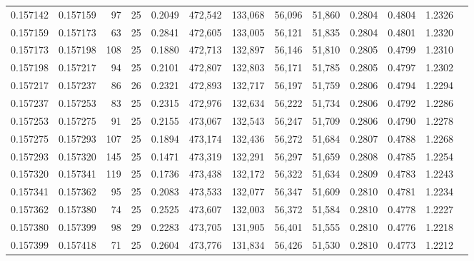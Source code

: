 \begin{tabular}{rrrrrrrrrrrrr}
0.157142 & 0.157159 &    97 &  25 &                                     0.2049 & 472,542 & 133,068 &  56,096 &  51,860 & 0.2804 & 0.4804 & 1.2326 \\
0.157159 & 0.157173 &    63 &  25 &                                     0.2841 & 472,605 & 133,005 &  56,121 &  51,835 & 0.2804 & 0.4801 & 1.2320 \\
0.157173 & 0.157198 &   108 &  25 &                                     0.1880 & 472,713 & 132,897 &  56,146 &  51,810 & 0.2805 & 0.4799 & 1.2310 \\
0.157198 & 0.157217 &    94 &  25 &                                     0.2101 & 472,807 & 132,803 &  56,171 &  51,785 & 0.2805 & 0.4797 & 1.2302 \\
0.157217 & 0.157237 &    86 &  26 &                                     0.2321 & 472,893 & 132,717 &  56,197 &  51,759 & 0.2806 & 0.4794 & 1.2294 \\
0.157237 & 0.157253 &    83 &  25 &                                     0.2315 & 472,976 & 132,634 &  56,222 &  51,734 & 0.2806 & 0.4792 & 1.2286 \\
0.157253 & 0.157275 &    91 &  25 &                                     0.2155 & 473,067 & 132,543 &  56,247 &  51,709 & 0.2806 & 0.4790 & 1.2278 \\
0.157275 & 0.157293 &   107 &  25 &                                     0.1894 & 473,174 & 132,436 &  56,272 &  51,684 & 0.2807 & 0.4788 & 1.2268 \\
0.157293 & 0.157320 &   145 &  25 &                                     0.1471 & 473,319 & 132,291 &  56,297 &  51,659 & 0.2808 & 0.4785 & 1.2254 \\
0.157320 & 0.157341 &   119 &  25 &                                     0.1736 & 473,438 & 132,172 &  56,322 &  51,634 & 0.2809 & 0.4783 & 1.2243 \\
0.157341 & 0.157362 &    95 &  25 &                                     0.2083 & 473,533 & 132,077 &  56,347 &  51,609 & 0.2810 & 0.4781 & 1.2234 \\
0.157362 & 0.157380 &    74 &  25 &                                     0.2525 & 473,607 & 132,003 &  56,372 &  51,584 & 0.2810 & 0.4778 & 1.2227 \\
0.157380 & 0.157399 &    98 &  29 &                                     0.2283 & 473,705 & 131,905 &  56,401 &  51,555 & 0.2810 & 0.4776 & 1.2218 \\
0.157399 & 0.157418 &    71 &  25 &                                     0.2604 & 473,776 & 131,834 &  56,426 &  51,530 & 0.2810 & 0.4773 & 1.2212 \\

\end{tabular}
